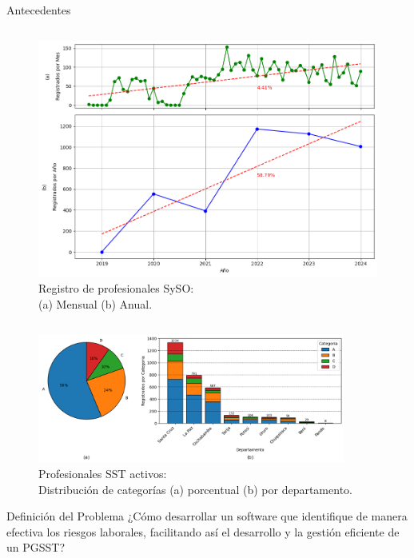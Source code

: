 \documentclass[spanish, aspectratio=169]{beamer}
\begin{document}
\begin{frame}[allowframebreaks]{Antecedentes}
\begin{columns}[T]
    \begin{figure}
        \centering
        \includegraphics[width=\textwidth, height=.5\textheight]{../images/marcoref/tendencia_profesionales_syso_registrados.png}
        \caption{Registro de profesionales SySO:\\(a) Mensual (b) Anual.}
        \label{fig:profesionales_syso_registrados}
    \end{figure}
    \end{columns} 

    \begin{figure}
      \centering
      \includegraphics[width=0.9\textwidth]{../images/marcoref/profesionales_syso_por_categoria.png}
      \caption{Profesionales SST activos:\\Distribución de categorías (a) porcentual (b) por departamento.}
      \label{fig:profesionales_syso_por_categoria} 
    \end{figure}
\end{frame}

\begin{frame}{Definición del Problema}
  ¿Cómo desarrollar un software que identifique de manera efectiva los riesgos laborales, facilitando así el desarrollo y la gestión eficiente de un PGSST?
\end{frame}
\end{document}
